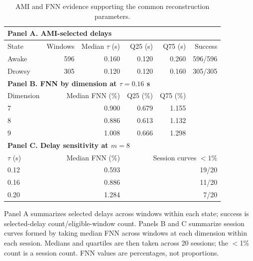 \begin{table}[p]
\centering
\small
\setlength{\tabcolsep}{3pt}
\renewcommand{\arraystretch}{1.12}
\caption{AMI and FNN evidence supporting the common reconstruction parameters.}
\label{tab:supp_embedding}
\begin{tabular}{lrrrrr}
\toprule
\multicolumn{6}{l}{\textbf{Panel A. AMI-selected delays}} \\
\midrule
State & Windows & Median $\tau$ (s) & Q25 (s) & Q75 (s) & Success \\
Awake & 596 & 0.160 & 0.120 & 0.260 & 596/596 \\
Drowsy & 305 & 0.120 & 0.120 & 0.160 & 305/305 \\
\midrule
\multicolumn{6}{l}{\textbf{Panel B. FNN by dimension at $\tau=0.16$ s}} \\
\midrule
Dimension & \multicolumn{2}{r}{Median FNN (\%)} & Q25 (\%) & Q75 (\%) & \\
7 & \multicolumn{2}{r}{0.900} & 0.679 & 1.155 & \\
8 & \multicolumn{2}{r}{0.886} & 0.613 & 1.132 & \\
9 & \multicolumn{2}{r}{1.008} & 0.666 & 1.298 & \\
\midrule
\multicolumn{6}{l}{\textbf{Panel C. Delay sensitivity at $m=8$}} \\
\midrule
$\tau$ (s) & \multicolumn{2}{r}{Median FNN (\%)} & \multicolumn{3}{r}{Session curves $<1\%$} \\
0.12 & \multicolumn{2}{r}{0.593} & \multicolumn{3}{r}{19/20} \\
0.16 & \multicolumn{2}{r}{0.886} & \multicolumn{3}{r}{11/20} \\
0.20 & \multicolumn{2}{r}{1.284} & \multicolumn{3}{r}{7/20} \\
\bottomrule
\end{tabular}
\par\smallskip
\begin{minipage}{0.98\linewidth}
\footnotesize Panel A summarizes selected delays across windows within each state; success is selected-delay count/eligible-window count. Panels B and C summarize session curves formed by taking median FNN across windows at each dimension within each session. Medians and quartiles are then taken across 20 sessions; the $<$1\% count is a session count. FNN values are percentages, not proportions.
\end{minipage}
\end{table}

